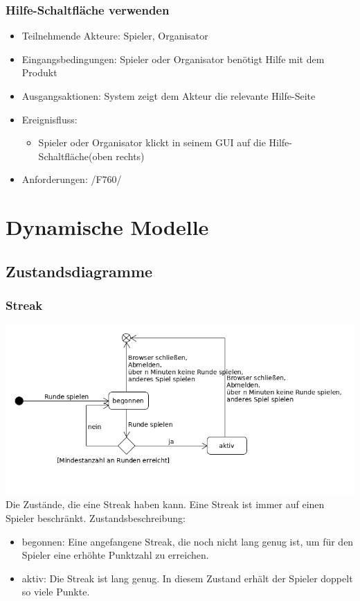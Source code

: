 \documentclass[a4paper]{scrreprt}
\begin{document}
    \subsection{Hilfe-Schaltfläche verwenden}
    \begin{itemize}
        \item Teilnehmende Akteure: \Gls{Spieler}, \Gls{Organisator}
        \item Eingangsbedingungen: \Gls{Spieler} oder \Gls{Organisator} benötigt Hilfe mit dem Produkt
        \item Ausgangsaktionen: System zeigt dem Akteur die relevante Hilfe-Seite
        \item Ereignisfluss:
            \begin{itemize}
                \item \Gls{Spieler} oder \Gls{Organisator} klickt in seinem GUI auf die Hilfe-Schaltfläche(oben rechts)
            \end{itemize}
        \item Anforderungen: /F760/
    \end{itemize}


    \chapter{Dynamische Modelle}
    \section{Zustandsdiagramme}
    \subsection{Streak}
    \label{fig:Streak_State}
    \includegraphics[width=\textwidth]{uml/export/Streak_Zustand.png}
    Die Zustände, die eine Streak haben kann. Eine Streak ist immer auf einen \Gls{Spieler} beschränkt.
    Zustandsbeschreibung:
    \begin{itemize}
    \item begonnen: Eine angefangene Streak, die noch nicht lang genug ist, um für den \Gls{Spieler} eine erhöhte Punktzahl zu erreichen.
    \item aktiv: Die Streak ist lang genug. In diesem Zustand erhält der \Gls{Spieler} doppelt so viele Punkte.
    \end{itemize}
\end{document}

